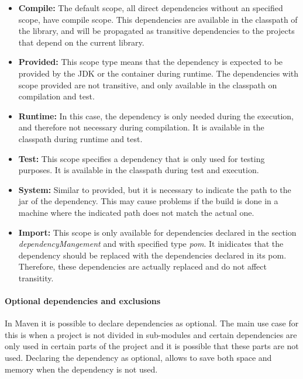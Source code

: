 \begin{itemize}
  \item \textbf{Compile:} The default scope, all direct dependencies without an specified scope, have compile scope. This dependencies are available in the classpath of the library, and will be propagated as transitive dependencies to the projects that depend on the current library.

  \item \textbf{Provided:} This scope type means that the dependency is expected to be provided by the JDK or the container during runtime. The dependencies with scope provided are not transitive, and only available in the classpath on compilation and test.

  \item \textbf{Runtime:} In this case, the dependency is only needed during the execution, and therefore not necessary during compilation. It is available in the classpath during runtime and test.

  \item \textbf{Test:} This scope specifies a dependency that is only used for testing purposes. It is available in the classpath during test and execution.

  \item \textbf{System:} Similar to provided, but it is necessary to indicate the path to the jar of the dependency. This may cause problems if the build is done in a machine where the indicated path does not match the actual one.

  \item \textbf{Import:} This scope is only available for dependencies declared in the section \textit{dependencyMangement} and with specified type \textit{pom}. It inidicates that the dependency should be replaced with the dependencies declared in its pom. Therefore, these dependencies are actually replaced and do not affect transitity.
\end{itemize}

\paragraph{Optional dependencies and exclusions}
In Maven it is possible to declare dependencies as optional. The main use case for this is when a project is not divided in sub-modules and certain dependencies are only used in certain parts of the project and it is possible that these parts are not used. Declaring the dependency as optional, allows to save both space and memory when the dependency is not used.

